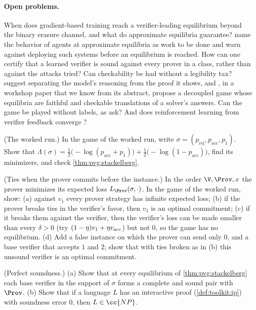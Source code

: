 \begin{refsection}
\paragraph{Open problems.} When does gradient-based training reach a verifier-leading equilibrium beyond the binary erasure channel, and what do approximate equilibria guarantee? \Textcite{AnilEtAl2021} name the behavior of agents at approximate equilibria as work to be done and warn against deploying such systems before an equilibrium is reached. How can one certify that a learned verifier is sound against every prover in a class, rather than against the attacks tried? Can checkability be had without a legibility tax? \Textcite{KirchnerEtAl2024} suggest separating the model's reasoning from the proof it shows, and \textcite{KimLee2026}, in a workshop paper that we know from its abstract, propose a decoupled game whose equilibria are faithful and checkable translations of a solver's answers. Can the game be played without labels, as \textcite{KirchnerEtAl2024} ask? And does reinforcement learning from verifier feedback converge \parencite[Remark~4.2]{AmitEtAl2025}?

\begin{exercises}
\item \consolidation (The worked run.) In the game of the worked run, write $\sigma=(p_{\mathrm{rej}},p_{\mathrm{acc}},p_1)$. Show that $\Lambda(\sigma)=\frac12\bigl(-\log(p_{\mathrm{acc}}+p_1)\bigr)+\frac12\bigl(-\log(1-p_{\mathrm{acc}})\bigr)$, find its minimizers, and check \cref{thm:pvg:stackelberg}.\label{ex:pvg:run}

\item \consolidation (Ties when the prover commits before the instance.) In the order $\V,\Prov,x$ the prover minimizes its expected loss $L_\Prov(\sigma,\cdot)$. In the game of the worked run, show: (a) against $v_1$ every prover strategy has infinite expected loss; (b) if the prover breaks ties in the verifier's favor, then $v_1$ is an optimal commitment; (c) if it breaks them against the verifier, then the verifier's loss can be made smaller than every $\delta>0$ (try $(1-\eta)v_1+\eta v_{\mathrm{acc}}$) but not $0$, so the game has no equilibrium. (d) Add a false instance on which the prover can send only $0$, and a base verifier that accepts $1$ and $2$; show that with ties broken as in (b) this unsound verifier is an optimal commitment.\label{ex:pvg:ties}

\item \consolidation\hard (Perfect soundness.) (a) Show that at every equilibrium of \cref{thm:pvg:stackelberg} each base verifier in the support of $\sigma$ forms a complete and sound pair with $\Prov$. (b) Show that if a language $L$ has an interactive proof (\cref{def:toolkit:ip}) with soundness error $0$, then $L\in\cc{NP}$. \label{ex:pvg:perfect}


\end{exercises}
\end{refsection}
